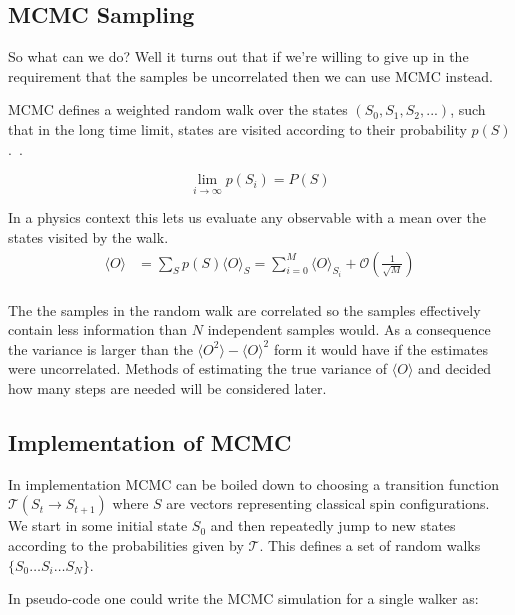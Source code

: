 \hypertarget{mcmc-sampling}{%
\subsection{MCMC Sampling}\label{mcmc-sampling}}

So what can we do? Well it turns out that if we're willing to give up in the requirement that the samples be uncorrelated then we can use MCMC instead.

MCMC defines a weighted random walk over the states \((S_0, S_1, S_2, ...)\), such that in the long time limit, states are visited according to their probability \(p(S)\).~\autocite{binderGuidePracticalWork1988,kerteszAdvancesComputerSimulation1998,wolffMonteCarloErrors2004}. ~\autocite{krauthIntroductionMonteCarlo1998}

\[\lim_{i\to\infty} p(S_i) = P(S)\]

In a physics context this lets us evaluate any observable with a mean over the states visited by the walk. \[\begin{aligned}
\langle O \rangle & = \sum_{S} p(S) \langle O \rangle_{S} = \sum_{i = 0}^{M} \langle O\rangle_{S_i} + \mathcal{O}(\tfrac{1}{\sqrt{M}})\\
\end{aligned}\]

The the samples in the random walk are correlated so the samples effectively contain less information than \(N\) independent samples would. As a consequence the variance is larger than the \(\langle O^2 \rangle - \langle O\rangle^2\) form it would have if the estimates were uncorrelated. Methods of estimating the true variance of \(\langle O \rangle\) and decided how many steps are needed will be considered later.

\hypertarget{implementation-of-mcmc}{%
\subsection{Implementation of MCMC}\label{implementation-of-mcmc}}

In implementation MCMC can be boiled down to choosing a transition function \(\mathcal{T}(S_{t} \rightarrow S_{t+1})\) where \(S\) are vectors representing classical spin configurations. We start in some initial state \(S_0\) and then repeatedly jump to new states according to the probabilities given by \(\mathcal{T}\). This defines a set of random walks \(\{S_0\ldots S_i\ldots S_N\}\).

In pseudo-code one could write the MCMC simulation for a single walker as:

